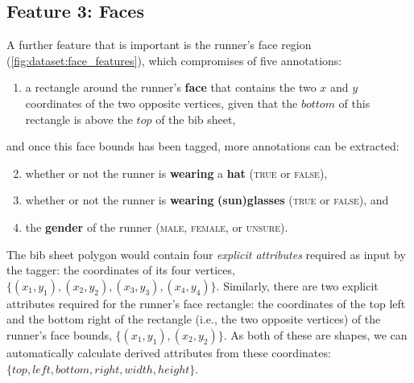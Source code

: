 \subsection{Feature 3: Faces}

A further feature that is important is the runner's face region (\cref{fig:dataset:face_features}), which compromises of five annotations:

\begin{enumerate}
  \item a rectangle around the runner's \textbf{face} that contains the two $x$ and $y$ coordinates of the two opposite vertices, given that the $bottom$ of this rectangle is above the $top$ of the bib sheet,
\end{enumerate}

\noindent
and once this face bounds has been tagged, more annotations can be extracted:

\begin{enumerate}
  \setcounter{enumi}{1}
  \item whether or not the runner is \textbf{wearing} a \textbf{hat} (\textsc{true} or \textsc{false}),
  \item whether or not the runner is \textbf{wearing} \textbf{(sun)glasses} (\textsc{true} or \textsc{false}), and
  \item the \textbf{gender} of the runner (\textsc{male}, \textsc{female}, or \textsc{unsure}).
\end{enumerate}

The bib sheet polygon would contain four \textit{explicit attributes} required as input by the tagger: the coordinates of its four vertices, $\{ (x_{1}, y_{1}), (x_{2}, y_{2}), (x_{3}, y_{3}), (x_{4}, y_{4}) \}$. Similarly, there are two explicit attributes required for the runner's face rectangle: the coordinates of the top left and the bottom right of the rectangle (i.e., the two opposite vertices) of the runner's face bounds, $\{ (x_{1}, y_{1}), (x_{2}, y_{2}) \}$. As both of these are shapes, we can automatically calculate derived attributes from these coordinates:  $\{ top, left, bottom, right, width, height \}$.


